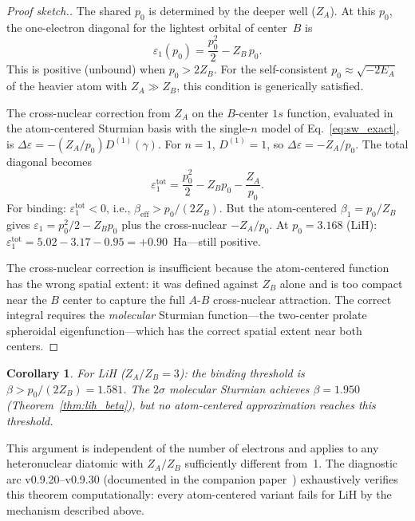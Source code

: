 \documentclass[aps,pra,twocolumn,superscriptaddress,longbibliography]{revtex4-2}
\newtheorem{corollary}{Corollary}
\theoremstyle{remark}
\theoremstyle{plain}
\begin{document}
\begin{proof}[Proof sketch.]
The shared $p_0$ is determined by the deeper well ($Z_A$).  At this
$p_0$, the one-electron diagonal for the lightest orbital of center~$B$
is
\begin{equation}
\varepsilon_1(p_0) = \frac{p_0^2}{2} - Z_B\, p_0.
\label{eq:h1s_diag}
\end{equation}
This is positive (unbound) when $p_0 > 2Z_B$.  For the self-consistent
$p_0 \approx \sqrt{-2E_A}$ of the heavier atom with $Z_A \gg Z_B$,
this condition is generically satisfied.

The cross-nuclear correction from $Z_A$ on the $B$-center $1s$ function,
evaluated in the atom-centered Sturmian basis with the single-$n$
model of Eq.~\eqref{eq:sw_exact}, is
$\Delta\varepsilon = -(Z_A/p_0) D^{(1)}(\gamma)$.  For $n = 1$,
$D^{(1)} = 1$, so $\Delta\varepsilon = -Z_A/p_0$.  The total diagonal
becomes
\begin{equation}
\varepsilon_1^{\text{tot}} = \frac{p_0^2}{2} - Z_B p_0 - \frac{Z_A}{p_0}.
\label{eq:h1s_total}
\end{equation}
For binding: $\varepsilon_1^{\text{tot}} < 0$, i.e.,
$\beta_{\text{eff}} > p_0/(2Z_B)$.  But the atom-centered $\beta_1 = p_0/Z_B$
gives $\varepsilon_1 = p_0^2/2 - Z_B p_0$ plus the cross-nuclear
$-Z_A/p_0$.  At $p_0 = 3.168$ (LiH): $\varepsilon_1^{\text{tot}} =
5.02 - 3.17 - 0.95 = +0.90$~Ha---still positive.

The cross-nuclear correction is insufficient because the atom-centered
function has the wrong spatial extent: it was defined against $Z_B$
alone and is too compact near the $B$ center to capture the full
$A$-$B$ cross-nuclear attraction.  The correct integral requires the
\emph{molecular} Sturmian function---the two-center prolate spheroidal
eigenfunction---which has the correct spatial extent near both centers.
\end{proof}

\begin{corollary}
For LiH ($Z_A/Z_B = 3$): the binding threshold is
$\beta > p_0/(2Z_B) = 1.581$.  The $2\sigma$ molecular Sturmian
achieves $\beta = 1.950$ (Theorem~\ref{thm:lih_beta}), but no
atom-centered approximation reaches this threshold.
\end{corollary}

This argument is independent of the number of electrons and applies to
any heteronuclear diatomic with $Z_A/Z_B$ sufficiently different from~1.
The diagnostic arc v0.9.20--v0.9.30 (documented in the companion
paper~\cite{loutey_fci}) exhaustively verifies this theorem
computationally: every atom-centered variant fails for LiH by the
mechanism described above.
\end{document}
